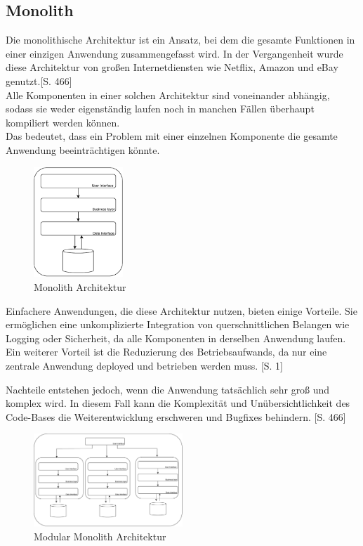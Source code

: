 \documentclass[acmtog]{acmart}
\begin{document}
\subsection{Monolith}
Die monolithische Architektur ist ein Ansatz, bei dem die gesamte Funktionen in 
einer einzigen Anwendung zusammengefasst wird. 
In der Vergangenheit wurde diese Architektur von großen Internetdiensten wie Netflix, 
Amazon und eBay genutzt.\cite{mono}[S. 466]\\
Alle Komponenten in einer solchen Architektur sind voneinander abhängig, sodass sie 
weder eigenständig laufen noch in manchen Fällen überhaupt kompiliert werden können. \cite{mono3}\\ 
Das bedeutet, dass ein Problem mit einer einzelnen Komponente die gesamte Anwendung 
beeinträchtigen könnte.

\begin{figure}[h!]
    \centering
    \includegraphics[width=0.3\textwidth]{images/mono.pdf}
    \caption{Monolith Architektur}
    \label{fig:layered-request-flow}
\end{figure}

Einfachere Anwendungen, die diese Architektur nutzen, bieten einige Vorteile. 
Sie ermöglichen eine unkomplizierte Integration von querschnittlichen Belangen 
wie Logging oder Sicherheit, da alle Komponenten in derselben Anwendung laufen. 
Ein weiterer Vorteil ist die Reduzierung des Betriebsaufwands, da nur eine 
zentrale Anwendung deployed und betrieben werden muss. \cite{mono2}[S. 1]

Nachteile entstehen jedoch, wenn die Anwendung tatsächlich sehr groß und komplex 
wird. In diesem Fall kann die Komplexität und Unübersichtlichkeit des Code-Bases 
die Weiterentwicklung erschweren und Bugfixes behindern. \cite{mono}[S. 466]\\


\begin{figure}[h!]
    \centering
    \includegraphics[width=0.5\textwidth]{images/mono-modular.pdf}
    \caption{Modular Monolith Architektur}
    \label{fig:layered-request-flow}
\end{figure}
\end{document}
